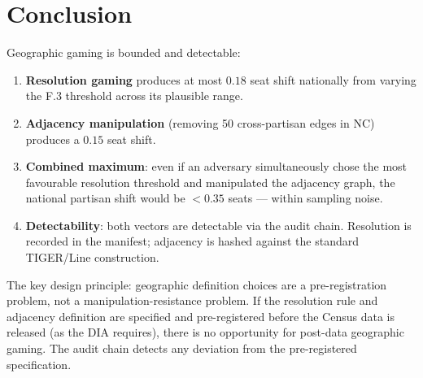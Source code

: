 \section{Conclusion}

Geographic gaming is bounded and detectable:
\begin{enumerate}
  \item \textbf{Resolution gaming} produces at most $0.18$ seat shift nationally
    from varying the F.3 threshold across its plausible range.
  \item \textbf{Adjacency manipulation} (removing 50 cross-partisan edges in NC)
    produces a $0.15$ seat shift.
  \item \textbf{Combined maximum}: even if an adversary simultaneously chose the
    most favourable resolution threshold and manipulated the adjacency graph,
    the national partisan shift would be $< 0.35$ seats --- within sampling noise.
  \item \textbf{Detectability}: both vectors are detectable via the audit chain.
    Resolution is recorded in the manifest; adjacency is hashed against the
    standard TIGER/Line construction.
\end{enumerate}

The key design principle: geographic definition choices are a pre-registration
problem, not a manipulation-resistance problem.
If the resolution rule and adjacency definition are specified and pre-registered
before the Census data is released (as the DIA requires), there is no opportunity
for post-data geographic gaming.
The audit chain detects any deviation from the pre-registered specification.
